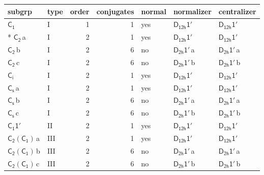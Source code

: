 \documentclass[10pt,a4paper]{article}
\numberwithin{equation}{section}
\newcommand{\grp}[1]{\mathsf{#1}}
\newcommand{\clsletter}[1]{\,{\scriptsize\color{black!55}#1}}
\begin{document}
{\small\begin{longtable}{@{}llrrlll@{}}\toprule
subgrp & type & order & conjugates & normal & normalizer & centralizer\\\midrule\endhead
\bottomrule\endfoot\endlastfoot
\href{../../../rotation/data/pdf/C1.pdf}{$\grp{C_{1}}$} & I & 1 & 1 & yes & \href{D12h-1p.pdf}{$\grp{D_{12h}1'}$} & \href{D12h-1p.pdf}{$\grp{D_{12h}1'}$}\\*
\href{../../../rotation/data/pdf/C2.pdf}{$\grp{C_{2}}$}\clsletter{a} & I & 2 & 1 & yes & \href{D12h-1p.pdf}{$\grp{D_{12h}1'}$} & \href{D12h-1p.pdf}{$\grp{D_{12h}1'}$}\\
\href{../../../rotation/data/pdf/C2.pdf}{$\grp{C_{2}}$}\clsletter{b} & I & 2 & 6 & no & \href{D2h-1p.pdf}{$\grp{D_{2h}1'}$}\clsletter{a} & \href{D2h-1p.pdf}{$\grp{D_{2h}1'}$}\clsletter{a}\\
\href{../../../rotation/data/pdf/C2.pdf}{$\grp{C_{2}}$}\clsletter{c} & I & 2 & 6 & no & \href{D2h-1p.pdf}{$\grp{D_{2h}1'}$}\clsletter{b} & \href{D2h-1p.pdf}{$\grp{D_{2h}1'}$}\clsletter{b}\\
\href{../../../rotation/data/pdf/S2.pdf}{$\grp{C_{i}}$} & I & 2 & 1 & yes & \href{D12h-1p.pdf}{$\grp{D_{12h}1'}$} & \href{D12h-1p.pdf}{$\grp{D_{12h}1'}$}\\
\href{../../../rotation/data/pdf/C1v.pdf}{$\grp{C_{s}}$}\clsletter{a} & I & 2 & 1 & yes & \href{D12h-1p.pdf}{$\grp{D_{12h}1'}$} & \href{D12h-1p.pdf}{$\grp{D_{12h}1'}$}\\
\href{../../../rotation/data/pdf/C1v.pdf}{$\grp{C_{s}}$}\clsletter{b} & I & 2 & 6 & no & \href{D2h-1p.pdf}{$\grp{D_{2h}1'}$}\clsletter{a} & \href{D2h-1p.pdf}{$\grp{D_{2h}1'}$}\clsletter{a}\\
\href{../../../rotation/data/pdf/C1v.pdf}{$\grp{C_{s}}$}\clsletter{c} & I & 2 & 6 & no & \href{D2h-1p.pdf}{$\grp{D_{2h}1'}$}\clsletter{b} & \href{D2h-1p.pdf}{$\grp{D_{2h}1'}$}\clsletter{b}\\
\href{C1-1p.pdf}{$\grp{C_{1}1'}$} & II & 2 & 1 & yes & \href{D12h-1p.pdf}{$\grp{D_{12h}1'}$} & \href{D12h-1p.pdf}{$\grp{D_{12h}1'}$}\\
\href{C2-C1.pdf}{$\grp{C_{2}}(\grp{C_{1}})$}\clsletter{a} & III & 2 & 1 & yes & \href{D12h-1p.pdf}{$\grp{D_{12h}1'}$} & \href{D12h-1p.pdf}{$\grp{D_{12h}1'}$}\\
\href{C2-C1.pdf}{$\grp{C_{2}}(\grp{C_{1}})$}\clsletter{b} & III & 2 & 6 & no & \href{D2h-1p.pdf}{$\grp{D_{2h}1'}$}\clsletter{a} & \href{D2h-1p.pdf}{$\grp{D_{2h}1'}$}\clsletter{a}\\
\href{C2-C1.pdf}{$\grp{C_{2}}(\grp{C_{1}})$}\clsletter{c} & III & 2 & 6 & no & \href{D2h-1p.pdf}{$\grp{D_{2h}1'}$}\clsletter{b} & \href{D2h-1p.pdf}{$\grp{D_{2h}1'}$}\clsletter{b}\\

\end{longtable}}
\end{document}

